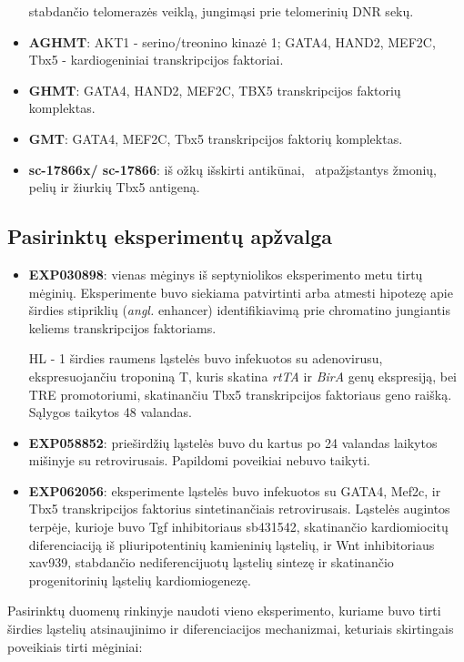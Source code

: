 \documentclass[12pt]{article}
\begin{document}
\begin{itemize}
          stabdančio telomerazės veiklą, jungimąsi prie telomerinių
          DNR sekų.
    \item \textbf{AGHMT}: AKT1 - serino/treonino kinazė 1; GATA4,
          HAND2, MEF2C, Tbx5 - kardiogeniniai transkripcijos faktoriai.
    \item \textbf{GHMT}: GATA4, HAND2, MEF2C, TBX5 transkripcijos
          faktorių komplektas.
    \item \textbf{GMT}: GATA4, MEF2C, Tbx5 transkripcijos
          faktorių komplektas.
    \item \textbf{sc-17866x/ sc-17866}: iš ožkų išskirti antikūnai,
    \     atpažįstantys žmonių, pelių ir žiurkių Tbx5 antigeną.
\end{itemize}


\subsection{Pasirinktų eksperimentų apžvalga}
\begin{itemize}
    \item \textbf{EXP030898}: vienas mėginys iš septyniolikos eksperimento
        metu tirtų mėginių. Eksperimente buvo siekiama patvirtinti arba
        atmesti hipotezę apie širdies stipriklių (\emph{angl.} enhancer)
        identifikiavimą prie chromatino jungiantis keliems transkripcijos
        faktoriams.

        HL - 1 širdies raumens ląstelės buvo infekuotos
        su adenovirusu, ekspresuojančiu troponiną T, kuris skatina
        \emph{rtTA} ir \emph{BirA} genų ekspresiją, bei TRE promotoriumi,
        skatinančiu Tbx5 transkripcijos faktoriaus geno raišką.
        Sąlygos taikytos 48 valandas.
    \item \textbf{EXP058852}: prieširdžių ląstelės buvo du kartus po 24
        valandas laikytos mišinyje su retrovirusais. Papildomi poveikiai
        nebuvo taikyti.
    \item \textbf{EXP062056}: eksperimente ląstelės buvo infekuotos su
        GATA4, Mef2c, ir Tbx5 transkripcijos faktorius sintetinančiais
        retrovirusais. Ląstelės augintos terpėje, kurioje buvo {Tgf\textbeta}
        inhibitoriaus sb431542, skatinančio kardiomiocitų diferenciaciją
        iš pliuripotentinių kamieninių ląstelių, ir Wnt inhibitoriaus
        xav939, stabdančio nediferencijuotų ląstelių sintezę ir
        skatinančio progenitorinių ląstelių kardiomiogenezę.
\end{itemize}

Pasirinktų duomenų rinkinyje naudoti vieno eksperimento, kuriame buvo
tirti širdies ląstelių atsinaujinimo ir diferenciacijos mechanizmai,
keturiais skirtingais poveikiais tirti mėginiai:
\end{document}
